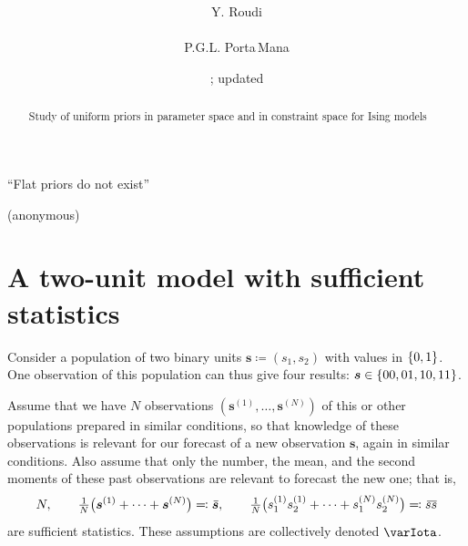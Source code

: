 \documentclass[\ifafour a4paper,12pt,\else a5paper,10pt,\fi%
onecolumn,oneside,article,%
british%
]{memoir}
\title{\propertitle%
}
\author{%
\hspace*{\stretch{1}}\parbox{0.5\linewidth}%
{\protect\centering Y. Roudi\\%
\footnotesize\epost{\email{yasser.roudi}{ntnu.no}}}%
\hspace*{\stretch{1}}\parbox{0.5\linewidth}%
{\protect\centering P.G.L. Porta\,Mana\\%
\footnotesize\epost{\email{piero.mana}{ntnu.no}}}%
\hspace*{\stretch{1}}%
}
\date{\firstdraft; updated \updated}
\theoremstyle{remark}
\theoremstyle{innote}
\newcommand*{\asudedication}[1]{%
{\par\centering\textit{#1}\par}}
\newcommand*{\defd}{\coloneqq}
\newcommand*{\defs}{\eqqcolon}
\DeclarePairedDelimiter\set{\{}{\}}
\renewcommand*{\|}{\mathpunct{|}}
\newcommand*{\widebar}[1]{{\mkern1.5mu\skew{2}\overline{\mkern-1.5mu#1\mkern-1.5mu}\mkern 1.5mu}}
\newcommand*{\yI}{\varIota}
\newcommand*{\ys}{\bm{s}}
\newcommand*{\yso}[1]{\ys^{(#1)}}
\newcommand*{\ysso}[1]{s^{(#1)}}
\newcommand*{\yav}{\widebar{\ys}}
\newcommand*{\ycv}{\widebar{ss}}
\begin{document}
\captiondelim{\quad}\captionnamefont{\footnotesize}\captiontitlefont{\footnotesize}
\frenchspacing

\maketitle
\ifpublic
\abstractrunin
\abslabeldelim{}
\renewcommand*{\abstractname}{}
\setlength{\absleftindent}{0pt}
\setlength{\absrightindent}{0pt}
\setlength{\abstitleskip}{-\absparindent}
\begin{abstract}%
  \noindent Study of uniform priors in parameter space and in constraint
  space for Ising models
\end{abstract}\fi

\frenchspacing

\setlength{\epigraphwidth}{.63\columnwidth}
\epigraphfontsize{\footnotesize}
\setlength{\epigraphrule}{0pt}
\epigraph{\enquote{Flat priors do not exist}}{(anonymous)}

\section{A two-unit model with sufficient statistics}
\label{sec:intro}

Consider a population of two binary units $\ys \defd (s_1,s_2)$ with values in
$\set{0,1}$. One observation of this population can thus give four results:
$\ys \in \set{00,01,10,11}$.

Assume that we have $N$ observations $(\yso{1}, \dotsc, \yso{N})$ of this
or other populations prepared in similar conditions, so that knowledge of
these observations is relevant for our forecast of a new observation $\ys$,
again in similar conditions. Also assume that only the number, the mean,
and the second moments of these past observations are relevant to forecast
the new one; that is,
\begin{equation}
  \label{eq:mean_2ndmom}
  N,\qquad
  \tfrac{1}{N}\bigl( \yso{1} + \dotsb + \yso{N} \bigr) \defs \yav,
  \qquad
  \tfrac{1}{N}\bigl( \ysso{1}_1\ysso{1}_2 + \dotsb + \ysso{N}_1 \ysso{N}_2 \bigr)
  \defs \ycv
\end{equation}
are sufficient statistics. These assumptions are collectively denoted
$\yI$.
\end{document}
